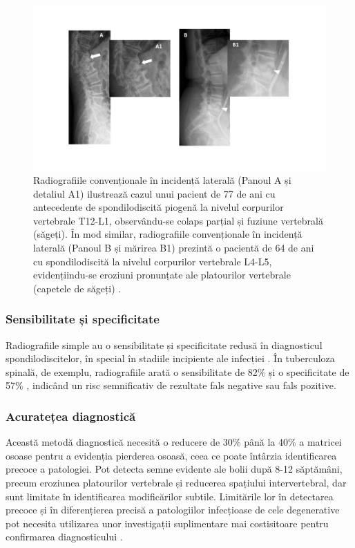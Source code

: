 \documentclass[romanian,12pt,a4paper]{article}
\begin{document}
\begin{figure}\label{rx-general}
\centering
\includegraphics[width=\textwidth]{Files/rx-general.png}
\caption{Radiografiile convenționale în incidență laterală (Panoul A și
detaliul A1) ilustrează cazul unui pacient de 77 de ani cu antecedente de
spondilodiscită piogenă la nivelul corpurilor vertebrale T12-L1,
observându-se colaps parțial și fuziune vertebrală (săgeți). În mod
similar, radiografiile convenționale în incidență laterală (Panoul B și
mărirea B1) prezintă o pacientă de 64 de ani cu spondilodiscită la
nivelul corpurilor vertebrale L4-L5, evidențiindu-se eroziuni pronunțate
ale platourilor vertebrale (capetele de săgeți)
\cite{ImagingSpondylodiscitisComprehensive2024}.}
\end{figure}


\subsubsection{Sensibilitate și specificitate}

Radiografiile simple au o sensibilitate și specificitate redusă în
diagnosticul spondilodiscitelor, în special în stadiile incipiente ale
infecției
\cite{SuggestionsManagingPyogenic2007}\cite{SpinalInfections2005}\cite{ImagingSpondylodiscitisComprehensive2024}.
În tuberculoza spinală, de exemplu, radiografiile arată o sensibilitate
de 82\% și o specificitate de 57\% \cite{SpinalInfectionsClinical2014},
indicând un risc semnificativ de rezultate fals negative sau fals
pozitive.

\subsubsection{Acuratețea diagnostică}

Această metodă diagnostică necesită o reducere de 30\% până la 40\% a
matricei osoase pentru a evidenția pierderea osoasă, ceea ce poate
întârzia identificarea precoce a patologiei. Pot detecta semne evidente
ale bolii după 8-12 săptămâni, precum eroziunea platourilor vertebrale
și reducerea spațiului intervertebral, dar sunt limitate în
identificarea modificărilor subtile. Limitările lor în detectarea
precoce și în diferențierea precisă a patologiilor infecțioase de cele
degenerative pot necesita utilizarea unor investigații suplimentare mai
costisitoare pentru confirmarea diagnosticului
\cite{SpinalInfectionsClinical2014}.
\end{document}
